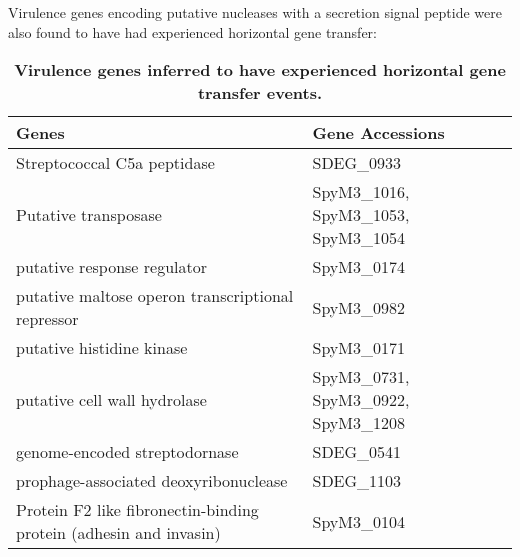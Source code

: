 \documentclass[10pt]{article}
\providecommand{\tabularnewline}{\\}
\begin{document}
Virulence genes encoding putative
nucleases with a secretion signal peptide were also found to have had
experienced horizontal gene transfer: 



\begin{table}
\caption{\label{tab:virhgt}
\bf{Virulence genes inferred to have experienced horizontal gene transfer
events.}}
\noindent \begin{centering}
\begin{tabular}{ll}
\hline 
Genes & Gene Accessions\tabularnewline
\hline 
Streptococcal C5a peptidase & SDEG\_0933\\ 
Putative transposase & SpyM3\_1016, SpyM3\_1053, SpyM3\_1054\\
putative response regulator & SpyM3\_0174\\
putative maltose operon transcriptional repressor & SpyM3\_0982\\ 
putative histidine kinase & SpyM3\_0171\\
putative cell wall hydrolase & SpyM3\_0731, SpyM3\_0922, SpyM3\_1208\\
genome-encoded streptodornase & SDEG\_0541\\
prophage-associated deoxyribonuclease & SDEG\_1103\\
Protein F2 like fibronectin-binding protein (adhesin and invasin) & SpyM3\_0104\\
\hline 
\end{tabular}
\par\end{centering}
\end{table}
\end{document}
